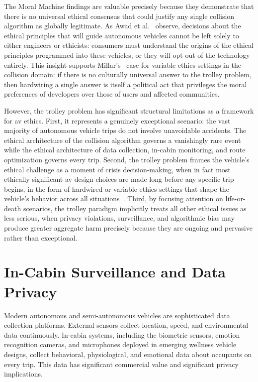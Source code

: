 \documentclass{ieee-portfolio}
\begin{document}
The Moral Machine findings are valuable precisely because they demonstrate that there is no universal ethical consensus that could justify any single collision algorithm as globally legitimate. As Awad et al.~\cite{awad_moral_2018} observe, decisions about the ethical principles that will guide autonomous vehicles cannot be left solely to either engineers or ethicists: consumers must understand the origins of the ethical principles programmed into these vehicles, or they will opt out of the technology entirely. This insight supports Millar's~\cite{millar_ethics_2017} case for variable ethics settings in the collision domain: if there is no culturally universal answer to the trolley problem, then hardwiring a single answer is itself a political act that privileges the moral preferences of developers over those of users and affected communities.
 
However, the trolley problem has significant structural limitations as a framework for \gls{av} ethics. First, it represents a genuinely exceptional scenario: the vast majority of autonomous vehicle trips do not involve unavoidable accidents. The ethical architecture of the collision algorithm governs a vanishingly rare event while the ethical architecture of data collection, in-cabin monitoring, and route optimization governs every trip. Second, the trolley problem frames the vehicle's ethical challenge as a moment of crisis decision-making, when in fact most ethically significant \gls{av} design choices are made long before any specific trip begins, in the form of hardwired or variable ethics settings that shape the vehicle's behavior across all situations~\cite{millar_ethics_2017}. Third, by focusing attention on life-or-death scenarios, the trolley paradigm implicitly treats all other ethical issues as less serious, when privacy violations, surveillance, and algorithmic bias may produce greater aggregate harm precisely because they are ongoing and pervasive rather than exceptional.
 
\section{In-Cabin Surveillance and Data Privacy}
 
Modern autonomous and semi-autonomous vehicles are sophisticated data collection platforms. External sensors collect location, speed, and environmental data continuously. In-cabin systems, including the biometric sensors, emotion recognition cameras, and microphones deployed in emerging wellness vehicle designs, collect behavioral, physiological, and emotional data about occupants on every trip. This data has significant commercial value and significant privacy implications.
 
\end{document}
